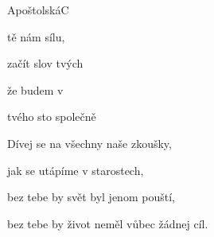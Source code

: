 \setcounter{page}{104}
\begin{song}{Apoštolská}{C}{}

\begin{SBVerse}

  tě   nám  sílu, 

  začít  slov tvých   

  že  budem v 

 tvého sto  společně    

\end{SBVerse}

\begin{SBVerse}

Dívej se na všechny naše zkoušky,

jak se utápíme v starostech,

bez tebe by svět byl jenom pouští,

bez tebe by život neměl vůbec žádnej cíl.

\end{SBVerse}

\end{song}
